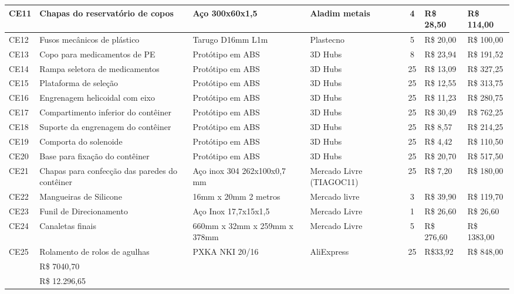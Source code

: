 \begin{table}[H]
\begin{adjustbox}{max width = 0.7\textwidth}
\begin{tabular}{|l|G{4cm}|C{2.4cm}|L{3.2cm}|c|l|l|}
        CE11 & Chapas do reservatório de copos & Aço 300x60x1,5 & Aladim metais & 4 & R\$ 28,50 & R\$ 114,00  \\ \hline
        CE12 & Fusos mecânicos de plástico & Tarugo D16mm L1m  & Plastecno & 5 & R\$ 20,00 & R\$ 100,00  \\ \hline
        CE13 & Copo para medicamentos de PE & Protótipo em ABS & 3D Hubs & 8 & R\$ 23,94 & R\$ 191,52  \\ \hline
        CE14 & Rampa seletora de medicamentos & Protótipo em ABS & 3D Hubs  & 25 & R\$ 13,09 & R\$ 327,25  \\ \hline
        CE15 & Plataforma de seleção & Protótipo em ABS & 3D Hubs & 25  & R\$ 12,55 & R\$ 313,75  \\ \hline
        CE16 & Engrenagem helicoidal com eixo & Protótipo em ABS & 3D Hubs & 25  & R\$ 11,23 & R\$ 280,75  \\ \hline
        CE17 & Compartimento inferior do contêiner & Protótipo em ABS & 3D Hubs & 25  & R\$ 30,49 & R\$ 762,25  \\ \hline
        CE18 & Suporte da engrenagem do contêiner & Protótipo em ABS & 3D Hubs & 25  & R\$ 8,57 & R\$ 214,25  \\ \hline
        CE19 & Comporta do solenoide & Protótipo em ABS & 3D Hubs & 25  & R\$ 4,42 & R\$ 110,50  \\ \hline
        CE20 & Base para fixação do contêiner & Protótipo em ABS & 3D Hubs & 25  & R\$ 20,70 & R\$ 517,50  \\ \hline
        CE21 & Chapas para confecção das paredes do contêiner & Aço inox 304 262x100x0,7 mm & Mercado Livre (TIAGOC11) & 25  & R\$ 7,20 & R\$ 180,00  \\ \hline
        CE22 & Mangueiras de Silicone & 16mm x 20mm 2 metros & Mercado livre & 3 & R\$ 39,90 & R\$ 119,70 \\ \hline
        CE23 & Funil de Direcionamento & Aço Inox 17,7x15x1,5 & Mercado Livre & 1 & R\$ 26,60 & R\$ 26,60 \\ \hline
        CE24 & Canaletas finais & 660mm x 32mm x 259mm x 378mm & Mercado Livre & 5 & R\$ 276,60 & R\$ 1383,00\\ \hline
        CE25 & Rolamento de rolos de agulhas & PXKA NKI 20/16 & AliExpress & 25 & R\$33,92 & R\$ 848,00 \\ \hline
        
         & R\$ 7040,70\\ \hline
        
         & \color{white}R\$ 12.296,65\\ \hline
        \end{tabular}
	\end{adjustbox}
\end{table}


